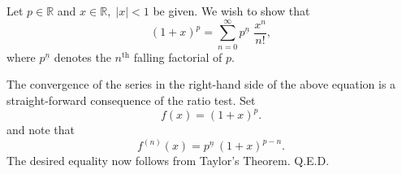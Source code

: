 \documentclass{article}
\newcommand{\reals}{\mathbb{R}}
\newcommand{\supth}{^{\text{th}}}
\begin{document}
Let  $p\in \reals$ and $x\in\reals,\;|x|<1$ be given.  We wish to show
that 
$$(1+x)^p = \sum_{n=0}^\infty p^{\underline{n}}\; \frac{x^n}{n!},$$
where $p^{\underline{n}}$ denotes the $n\supth$ falling factorial of $p$.  

The convergence of the series in the right-hand side of the above
equation is a straight-forward consequence of the ratio test. Set 
$$f(x) = (1+x)^p.$$
and note that
$$f^{(n)}(x) = p^{\underline{n}}\, (1+x)^{p-n}.$$
The desired equality now follows from Taylor's Theorem. Q.E.D.
\end{document}
